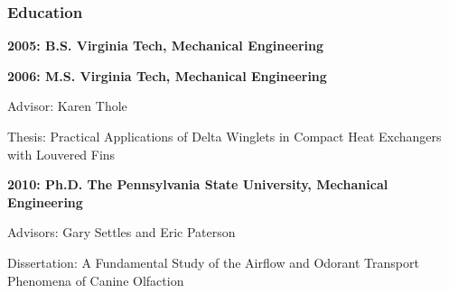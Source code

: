 \subsubsection*{\large{Education}}
\vspace{-0.15in}

\textbf{2005: B.S. Virginia Tech, Mechanical Engineering}
\vspace{-0.1in}

\textbf{2006: M.S. Virginia Tech, Mechanical Engineering}

\vspace{-0.1in}
\hspace*{0.2in}Advisor: Karen Thole

\vspace{-0.1in}
\hspace*{0.2in}Thesis: Practical Applications of Delta Winglets in Compact Heat Exchangers with Louvered Fins

\textbf{2010: Ph.D. The Pennsylvania State University, Mechanical Engineering}

\vspace{-0.1in}
\hspace*{0.2in}Advisors: Gary Settles and Eric Paterson
    
\vspace{-0.1in}
\hspace*{0.2in}Dissertation: A Fundamental Study of the Airflow and Odorant Transport Phenomena of Canine Olfaction
